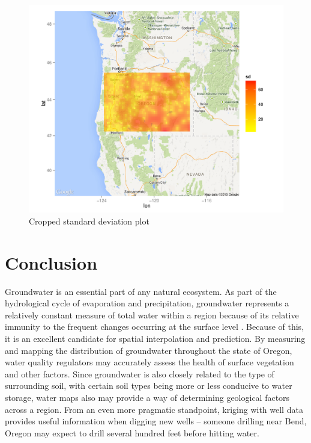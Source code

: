 \documentclass[12pt,twoside]{reedthesis}
\begin{document}
\begin{figure}[h]
	   
	       \centering
	  
	    \includegraphics[scale=0.5]{sd_crop}
	
	     \caption{Cropped standard deviation plot}
	 \label{sdcrop}
	\end{figure}
	

\chapter*{Conclusion}
	\setcounter{chapter}{4}
	\setcounter{section}{0}
	
Groundwater is an essential part of any natural ecosystem. As part of the hydrological cycle of evaporation and precipitation, groundwater represents a relatively constant measure of total water within a region because of its relative immunity to the frequent changes occurring at the surface level \cite{groundwater}. Because of this, it is an excellent candidate for spatial interpolation and prediction. By measuring and mapping the distribution of groundwater throughout the state of Oregon, water quality regulators may accurately assess the health of surface vegetation and other factors. Since groundwater is also closely related to the type of surrounding soil, with certain soil types being more or less conducive to water storage, water maps also may provide a way of determining geological factors across a region. From an even more pragmatic standpoint, kriging with well data provides useful information when digging new wells -- someone drilling near Bend, Oregon may expect to drill several hundred feet before hitting water. \\
\end{document}
